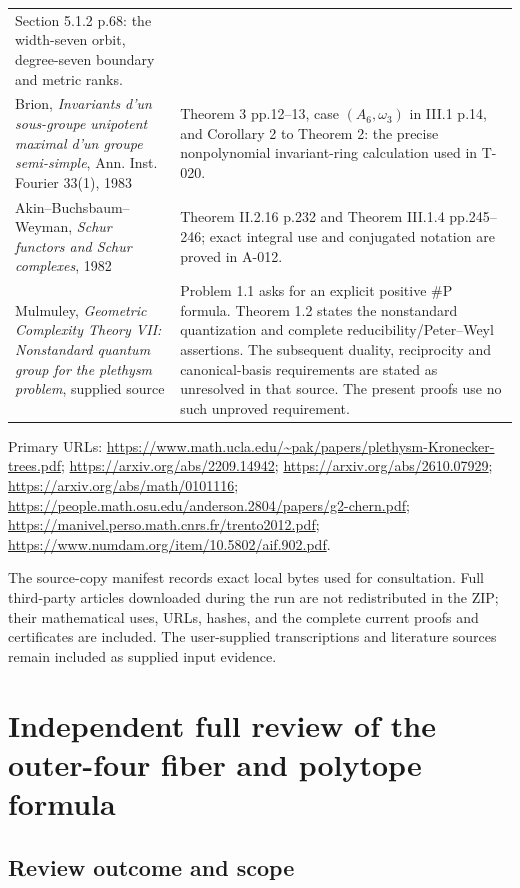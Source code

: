 \documentclass[
  10pt,
]{article}
\begin{document}
\begin{longtable}[]{@{}
  >{\raggedright\arraybackslash}p{}
  >{\raggedright\arraybackslash}p{}@{}}
Section 5.1.2 p.68: the width-seven orbit, degree-seven boundary and
metric ranks. \\
Brion, \emph{Invariants d'un sous-groupe unipotent maximal d'un groupe
semi-simple}, Ann. Inst. Fourier 33(1), 1983 & Theorem 3 pp.12--13, case
\((A_6,\omega_3)\) in III.1 p.14, and Corollary 2 to Theorem 2: the
precise nonpolynomial invariant-ring calculation used in T-020. \\
Akin--Buchsbaum--Weyman, \emph{Schur functors and Schur complexes}, 1982
& Theorem II.2.16 p.232 and Theorem III.1.4 pp.245--246; exact integral
use and conjugated notation are proved in A-012. \\
Mulmuley, \emph{Geometric Complexity Theory VII: Nonstandard quantum
group for the plethysm problem}, supplied source & Problem 1.1 asks for
an explicit positive \#P formula. Theorem 1.2 states the nonstandard
quantization and complete reducibility/Peter--Weyl assertions. The
subsequent duality, reciprocity and canonical-basis requirements are
stated as unresolved in that source. The present proofs use no such
unproved requirement. \\
\end{longtable}

Primary URLs:
\url{https://www.math.ucla.edu/~pak/papers/plethysm-Kronecker-trees.pdf};
\url{https://arxiv.org/abs/2209.14942};
\url{https://arxiv.org/abs/2610.07929};
\url{https://arxiv.org/abs/math/0101116};
\url{https://people.math.osu.edu/anderson.2804/papers/g2-chern.pdf};
\url{https://manivel.perso.math.cnrs.fr/trento2012.pdf};
\url{https://www.numdam.org/item/10.5802/aif.902.pdf}.

The source-copy manifest records exact local bytes used for
consultation. Full third-party articles downloaded during the run are
not redistributed in the ZIP; their mathematical uses, URLs, hashes, and
the complete current proofs and certificates are included. The
user-supplied transcriptions and literature sources remain included as
supplied input evidence.

\section{Independent full review of the outer-four fiber and polytope
formula}\label{independent-full-review-of-the-outer-four-fiber-and-polytope-formula}

\subsection{Review outcome and scope}\label{review-outcome-and-scope}
\end{document}
